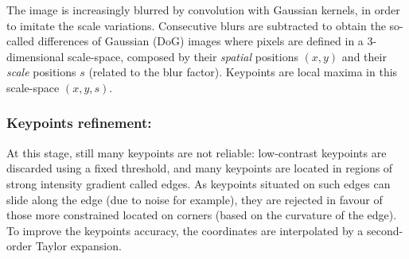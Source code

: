 \documentclass[preprint]{iucr}
\begin{document}
The image is increasingly blurred by convolution with Gaussian kernels, in
order to imitate the scale variations.
Consecutive blurs are subtracted to obtain the so-called differences of
Gaussian (DoG) images where pixels are defined in a 3-dimensional
scale-space, composed by  their \emph{spatial} positions $(x, y)$ and their
\emph{scale} positions $s$ (related to the blur factor). Keypoints are
local maxima in this scale-space $(x, y, s)$.



\subsubsection{Keypoints refinement:}

At this stage, still many keypoints are not reliable: low-contrast keypoints are
discarded using a fixed threshold, and many keypoints are located in regions of
strong intensity gradient called edges. As keypoints situated on such edges
can slide along the edge (due to noise for example), they are rejected in
favour of those more constrained located on corners (based on the curvature
of the edge).
To improve the keypoints accuracy, the coordinates are interpolated by a
second-order Taylor expansion.
\end{document}
